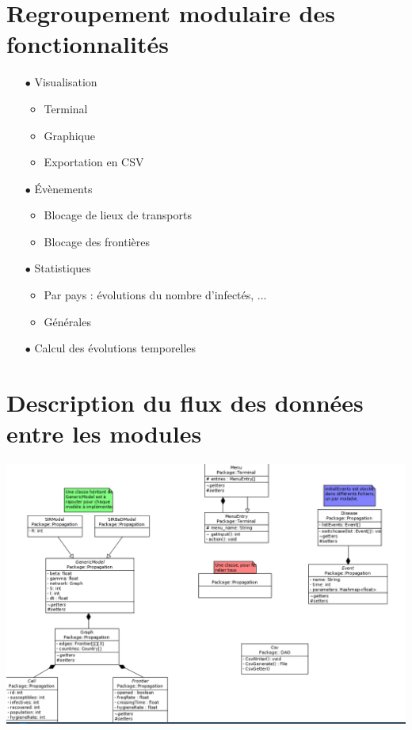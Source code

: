 \documentclass[12pt,a4paper]{report}
\begin{document}
\section*{Regroupement modulaire des fonctionnalités}
\begin{flushleft}
	\begin{itemize}
		\item[$\bullet$] Visualisation
			\begin{itemize}
				\item Terminal
				\item Graphique
				\item Exportation en CSV
			\end{itemize}
		\item[$\bullet$] Évènements
			\begin{itemize}
				\item Blocage de lieux de transports
				\item Blocage des frontières
			\end{itemize}
		\item[$\bullet$] Statistiques
			\begin{itemize}
				\item Par pays : évolutions du nombre d'infectés, ...
				\item Générales
			\end{itemize}
		\item[$\bullet$] Calcul des évolutions temporelles
	\end{itemize}
\end{flushleft}

\section*{Description du flux des données entre les modules}

\includegraphics[angle=270 , scale=0.5]{uml.png}
\end{document}

